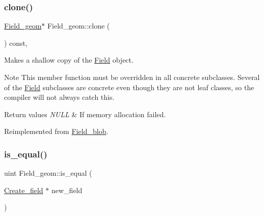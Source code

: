 \mbox{\label{classField__geom_ae0cdd2368852aafe6b325756ba3b5a24}} 
\subsubsection{\texorpdfstring{clone()}{clone()}\hspace{0.1cm}{\footnotesize\ttfamily [2/2]}}
{\footnotesize\ttfamily \mbox{\hyperlink{classField__geom}{Field\+\_\+geom}}$\ast$ Field\+\_\+geom\+::clone (\begin{DoxyParamCaption}{ }\end{DoxyParamCaption}) const\hspace{0.3cm}{\ttfamily [inline]}, {\ttfamily [virtual]}}

Makes a shallow copy of the \mbox{\hyperlink{classField}{Field}} object.

\begin{DoxyNote}{Note}
This member function must be overridden in all concrete subclasses. Several of the \mbox{\hyperlink{classField}{Field}} subclasses are concrete even though they are not leaf classes, so the compiler will not always catch this.
\end{DoxyNote}

\begin{DoxyRetVals}{Return values}
{\em N\+U\+LL} & If memory allocation failed. \\
\hline
\end{DoxyRetVals}


Reimplemented from \mbox{\hyperlink{classField__blob_a075469b9df8583c1dc4968a983577886}{Field\+\_\+blob}}.

\mbox{\label{classField__geom_a20953b29b4a85e8d77f16593313fd381}} 
\subsubsection{\texorpdfstring{is\+\_\+equal()}{is\_equal()}}
{\footnotesize\ttfamily uint Field\+\_\+geom\+::is\+\_\+equal (\begin{DoxyParamCaption}\item[{\mbox{\hyperlink{classCreate__field}{Create\+\_\+field}} $\ast$}]{new\+\_\+field }\end{DoxyParamCaption})\hspace{0.3cm}{\ttfamily [virtual]}}

